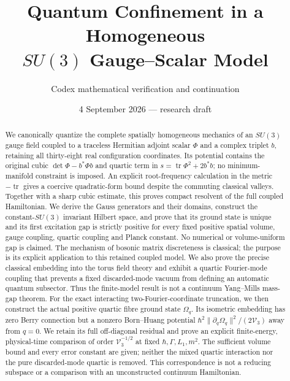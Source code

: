 \documentclass[11pt]{article}
\title{Quantum Confinement in a Homogeneous\\
$SU(3)$ Gauge--Scalar Model}
\author{Codex mathematical verification and continuation}
\date{4 September 2026 --- research draft}
\begin{document}
\maketitle
\begin{abstract}
We canonically quantize the complete spatially homogeneous mechanics
of an $SU(3)$ gauge field coupled to a traceless Hermitian adjoint scalar
$\Phi$ and a complex triplet $b$, retaining all thirty-eight real
configuration coordinates. Its potential contains the original cubic
$\det\Phi-b^*\Phi b$ and quartic term in
$s=\operatorname{tr}\Phi^2+2b^*b$; no minimum-manifold constraint is imposed.
An explicit root-frequency calculation in the metric $-\operatorname{tr}$
gives a coercive quadratic-form bound despite the commuting classical
valleys. Together with a sharp cubic estimate, this proves compact
resolvent of the full coupled Hamiltonian. We derive the Gauss generators
and their domains, construct the constant-$SU(3)$ invariant Hilbert space,
and prove that its ground state is unique and its first excitation gap
is strictly positive for every fixed positive spatial volume, gauge
coupling, quartic coupling and Planck constant. No numerical or
volume-uniform gap is claimed. The mechanism of bosonic matrix
discreteness is classical; the purpose is its explicit application to
this retained coupled model. We also prove the precise classical
embedding into the torus field theory and exhibit a quartic Fourier-mode
coupling that prevents a fixed discarded-mode vacuum from defining an
automatic quantum subsector. Thus the finite-model result is not a
continuum Yang--Mills mass-gap theorem.
For the exact interacting two-Fourier-coordinate truncation, we then
construct the actual positive quartic fibre ground state $\Omega_q$.
Its isometric embedding has zero Berry connection but a nonzero
Born--Huang potential $\hbar^2\|\partial_q\Omega_q\|^2/(2\mathcal V_3)$
away from $q=0$. We retain its full off-diagonal residual and prove
an explicit finite-energy, physical-time comparison of order
$\mathcal V_3^{-1/2}$ at fixed $\hbar,\Gamma,L_1,m^2$.
The sufficient volume bound and every error constant are given;
neither the mixed quartic interaction nor the pure discarded-mode
quartic is removed. This correspondence is not a reducing subspace
or a comparison with an unconstructed continuum Hamiltonian.
\end{abstract}

\end{document}
